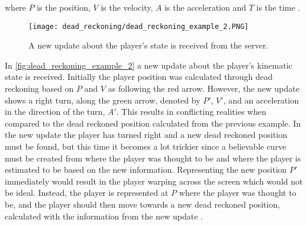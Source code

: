where $ P $ is the position, $ V $ is the velocity, $ A $ is the acceleration and $T$ is the time \autocite{DeadReckoning}.
\begin{figure}[H]
    \centering
    \texttt{[image: dead\_reckoning/dead\_reckoning\_example\_2.PNG]}
    \caption{A new update about the player's state is received from the server.}
    \label{fig:dead_reckoning_example_2}
\end{figure}
\noindent
In \autoref{fig:dead_reckoning_example_2} a new update about the player's kinematic state is received.
Initially the player position was calculated through dead reckoning based on $P$ and $V$ as following the red arrow.
However, the new update shows a right turn, along the green arrow, denoted by $P'$, $V'$, and an acceleration in the direction of the turn, $A'$.
This results in conflicting realities when compared to the dead reckoned position calculated from the previous example. 
In the new update the player has turned right and a new dead reckoned position must be found, but this time it becomes a lot trickier since a believable curve must be created from where the player was thought to be and where the player is estimated to be based on the new information.
Representing the new position $P'$ immediately would result in the player warping across the screen which would not be ideal.
Instead, the player is represented at $ P $ where the player was thought to be, and the player should then move towards a new dead reckoned position, calculated with the information from the new update \autocite{DeadReckoning}.


